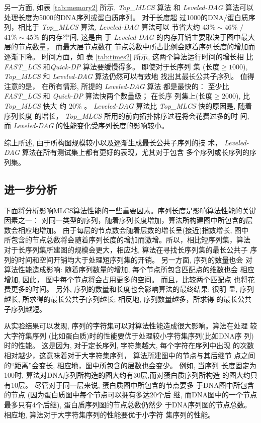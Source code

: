 另一方面, 如表 \ref{tab:memory2} 所示, \emph{Top\_MLCS} 算法
和 \emph{Leveled-DAG} 算法可以处理长度为5000的DNA序列或蛋白质序列。 对于长度超
过1000的DNA/蛋白质序列，相比于 \emph{Top\_MLCS} 算法, \emph{Leveled-DAG} 算法可以
节省大约 $43\% \sim 46\%$ $/$ $41\% \sim 45\%$ 的内存空间, 这是由
于 \emph{Leveled-DAG} 的内存开销主要取决于图中最大层的节点数量， 而最大层节点数在
节点总数中所占比例会随着序列长度的增加而逐渐下降。 时间方面，如
表 \ref{tab:times2} 所示, 这两个算法运行时间的增长相
比 \emph{FAST\_LCS} 和\emph{Quick-DP} 算法要缓慢得多。 即使对于长序列
集 ($长度 \geq 1000$), \emph{Top\_MLCS} 和 \emph{Leveled-DAG} 算法仍然可以有效地
找出其最长公共子序列。 值得注意的是， 在所有情形, 所提的 \emph{Leveled-DAG} 算法
都是最快的： 至少比 \emph{FAST\_LCS} 和 \emph{Quick-DP} 算法快两个数量级； 在长序
列集上($长度 \geq 2000$), 比 \emph{Top\_MLCS} 快大
约 $20\%$ 。 \emph{Leveled-DAG} 算法比 \emph{Top\_MLCS} 快的原因是, 随着序列长度
的增长， \emph{Top\_MLCS} 所用的前向拓扑排序过程将会花费过多的时
间, 而 \emph{Leveled-DAG} 的性能变化受序列长度的影响较小。

综上所述, 由于所构图规模较小以及逐渐生成最长公共子序列的技
术， \emph{Leveled-DAG} 算法在所有测试集上都有更好的表现，尤其对于包含
多个序列或长序列的序列集。

\subsection{进一步分析}

下面将分析影响MLCS算法性能的一些重要因素。序列长度是影响算法性能的关键
因素之一： 对同一类型的序列，随着序列长度增加，算法所构建图中所包含的层
数会相应地增加。 由于每层的节点数会随着层数的增长呈(接近)指数增长, 图中
所包含的节点总数将会随着序列长度的增加而激增。所以，相比短序列集，算法
对于长序列集所建图的规模会更大，相应地, 算法在寻找长序列集的最长公共子
序列的时间和空间开销均大于处理短序列集的开销。 另一方面, 序列的数量也会
对算法性能造成影响: 随着序列数量的增加, 每个节点所包含匹配点的维数也会
相应增加, 因此， 图中每个节点将会占用更多的空间。 而且，比较两个匹配点
也将花费更多的时间。 另外, 序列的数量和长度也会影响算法的最终结果: 很明
显, 序列越长, 所求得的最长公共子序列越长; 相反地, 序列数量越多，所求得
的最长公共子序列越短。

从实验结果可以发现, 序列的字符集可以对算法性能造成很大影响。算法在处理
较大字符集序列 (比如蛋白质)时的性能要优于处理较小字符集序列(比如DNA序
列)时的性能。 这是因为, 对于定长序列, 字符集越大, 每个字符在序列中出现
的次数相对越少，这意味着对于大字符集序列， 算法所建图中的节点与其后继节
点之间的“距离”会变长, 相应地，图中所包含的层数也会变少。 例如, 当序列
长度固定为100时, 算法对DNA序列所构造的图大约有30层,而对蛋白质序列所构造
的图大约只有10层。 尽管对于同一层来说, 蛋白质图中所包含的节点要多
于DNA图中所包含的节点 (因为蛋白质图中每个节点可以拥有多达20个后
继, 而DNA图中的一个节点最多只有4个后继), 蛋白质序列图的节点总数仍然少
于DNA序列图的节点总数。 相应地, 算法对于大字符集序列的性能要优于小字符
集序列的性能。

